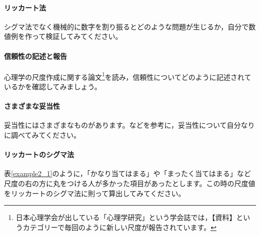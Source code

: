 \documentclass{ltjsbook}
\begin{document}
\paragraph{リッカート法}シグマ法でなく機械的に数字を割り振るとどのような問題が生じるか，自分で数値例を作って検証してみてください。
\paragraph{信頼性の記述と報告}心理学の尺度作成に関する論文\footnote{日本心理学会が出している「心理学研究」という学会誌では，【資料】というカテゴリーで毎回のように新しい尺度が報告されています。}を読み，信頼性についてどのように記述されているかを確認してみましょう。
\paragraph{さまざまな妥当性}妥当性にはさまざまなものがあります。\textcite{kosugi2016b}などを参考に，妥当性について自分なりに調べてみてください。
\paragraph{リッカートのシグマ法} 表\ref{example2_1}のように，「かなり当てはまる」や「まったく当てはまる」など尺度の右の方に丸をつける人が多かった項目があったとします。この時の尺度値をリッカートのシグマ法に則って算出してみてください。
\end{document}
